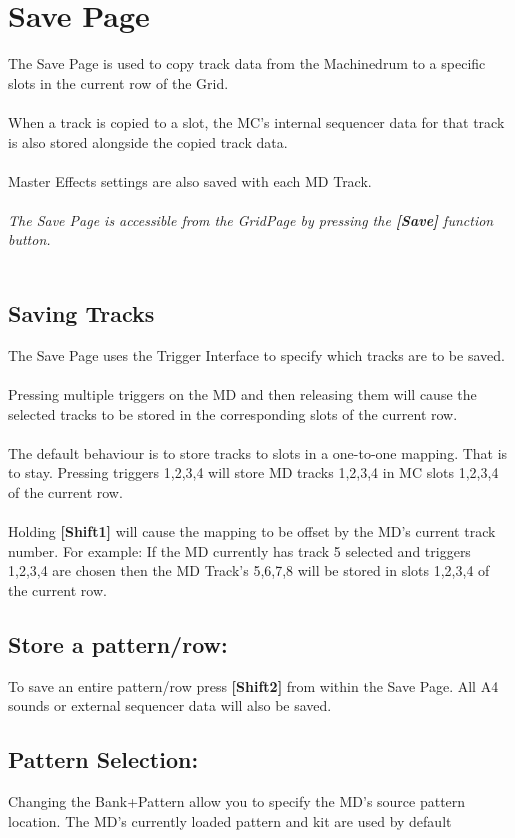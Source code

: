 \chapter{Save Page}

The Save Page is used to copy track data from the Machinedrum to a specific slots in the current row of the Grid. \\
\\
When a track is copied to a slot, the MC's internal sequencer data for that track is also stored alongside the copied track data.\\
\\
Master Effects settings are also saved with each MD Track.
\\\\
\textit{The Save Page is accessible from the GridPage by pressing the  \textbf{[Save]} function button.}
\\\\
\section{Saving Tracks}
The Save Page uses the Trigger Interface to specify which tracks are to be saved.\\
\\
Pressing multiple triggers on the MD and then releasing them will cause the selected tracks to be stored in the corresponding slots of the current row.\\
\\
The default behaviour is to store tracks to slots in a one-to-one mapping. That is to stay. Pressing triggers 1,2,3,4 will store MD tracks 1,2,3,4 in MC slots 1,2,3,4 of the current row.\\
\\
Holding  \textbf{[Shift1]} will cause the mapping to be offset by the MD's current track number. For example: If the MD currently has track 5 selected and triggers 1,2,3,4 are chosen then the MD Track's 5,6,7,8 will be stored in slots 1,2,3,4 of the current row.
\section{Store a pattern/row:}
To save an entire pattern/row press \textbf{[Shift2]} from within the Save Page.
All A4 sounds or external sequencer data will also be saved.



\section{Pattern Selection:}

Changing the Bank+Pattern allow you to specify the MD's source pattern location. The MD’s currently loaded pattern and kit are used by default
